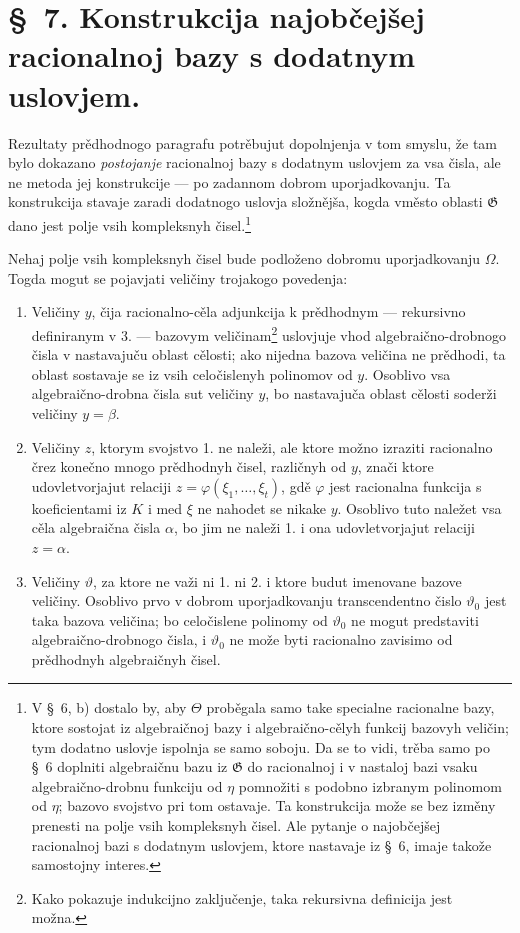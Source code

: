 \documentclass[11pt]{article}
\begin{document}
\section*{\S\ 7. Konstrukcija najobčejšej racionalnoj bazy s dodatnym uslovjem.}

Rezultaty prědhodnogo paragrafu potrěbujut dopolnjenja v tom smyslu, že tam
bylo dokazano {\itshape postojanje} racionalnoj bazy s dodatnym uslovjem za vsa
čisla, ale ne metoda jej konstrukcije --- po zadannom dobrom uporjadkovanju. Ta
konstrukcija stavaje zaradi dodatnogo uslovja složnějša, kogda vměsto oblasti
$\mathfrak G$ dano jest polje vsih kompleksnyh čisel.\footnote{V \S\ 6, b)
dostalo by, aby $\Theta$ proběgala samo take specialne racionalne bazy, ktore
sostojat iz algebraičnoj bazy i algebraično-cělyh funkcij bazovyh veličin;
tym dodatno uslovje ispolnja se samo soboju. Da se to vidi, trěba samo po
\S\ 6 doplniti algebraičnu bazu iz $\mathfrak G$ do racionalnoj i v nastaloj
bazi vsaku algebraično-drobnu funkciju od $\eta$ pomnožiti s podobno izbranym
polinomom od $\eta$; bazovo svojstvo pri tom ostavaje. Ta konstrukcija može se
bez izměny prenesti na polje vsih kompleksnyh čisel. Ale pytanje o
najobčejšej racionalnoj bazi s dodatnym uslovjem, ktore nastavaje iz \S\ 6,
imaje takože samostojny interes.}

Nehaj polje vsih kompleksnyh čisel bude podloženo dobromu uporjadkovanju
$\Omega$. Togda mogut se pojavjati veličiny trojakogo povedenja:
\begin{enumerate}
\item[1.] Veličiny $y$, čija racionalno-cěla adjunkcija k prědhodnym ---
rekursivno definiranym v 3. --- bazovym veličinam\footnote{Kako pokazuje
indukcijno zaključenje, taka rekursivna definicija jest možna.} uslovjuje
vhod algebraično-drobnogo čisla v nastavajuču oblast cělosti; ako nijedna
bazova veličina ne prědhodi, ta oblast sostavaje se iz vsih celočislenyh
polinomov od $y$. Osoblivo vsa algebraično-drobna čisla sut veličiny $y$, bo
nastavajuča oblast cělosti soderži veličiny $y=\beta$.
\item[2.] Veličiny $z$, ktorym svojstvo 1. ne naleži, ale ktore možno izraziti
racionalno črez konečno mnogo prědhodnyh čisel, različnyh od $y$, znači ktore
udovletvorjajut relaciji
$z=\varphi(\xi_1,\ldots,\xi_t)$, gdě $\varphi$ jest racionalna funkcija s
koeficientami iz $K$ i med $\xi$ ne nahodet se nikake $y$. Osoblivo tuto
naležet vsa cěla algebraična čisla $\alpha$, bo jim ne naleži 1. i ona
udovletvorjajut relaciji $z=\alpha$.
\item[3.] Veličiny $\vartheta$, za ktore ne važi ni 1. ni 2. i ktore budut
imenovane bazove veličiny. Osoblivo prvo v dobrom uporjadkovanju transcendentno
čislo $\vartheta_0$ jest taka bazova veličina; bo celočislene polinomy od
$\vartheta_0$ ne mogut predstaviti algebraično-drobnogo čisla, i
$\vartheta_0$ ne može byti racionalno zavisimo od prědhodnyh algebraičnyh čisel.
\end{enumerate}
\end{document}
